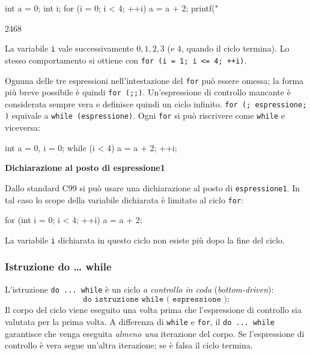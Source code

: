 \documentclass[11pt,a4paper]{article}
\begin{document}
\begin{esempio}
\begin{codice}
int a = 0;
int i;
for (i = 0; i < 4; ++i) {
    a = a + 2;
    printf("%
}
\end{codice}
\begin{risultato}
2468
\end{risultato}
La variabile \lstinline|i| vale successivamente $0, 1, 2, 3$ (e $4$, quando il ciclo termina). Lo stesso comportamento si ottiene con \lstinline|for (i = 1; i <= 4; ++i)|.
\end{esempio}

Ognuna delle tre espressioni nell'intestazione del \lstinline|for| può essere omessa; la forma più breve possibile è quindi \lstinline|for (;;)|. Un'espressione di controllo mancante è considerata sempre vera e definisce quindi un ciclo infinito. \lstinline|for (; espressione; )| equivale a \lstinline|while (espressione)|. Ogni \lstinline|for| si può riscrivere come \lstinline|while| e viceversa:
\begin{codice}
int a = 0, i = 0;
while (i < 4)
{
    a = a + 2;
    ++i;
}
\end{codice}

\medskip\noindent\textbf{Dichiarazione al posto di espressione1}\par\nopagebreak

Dallo standard C99 si può usare una dichiarazione al posto di \texttt{espressione1}. In tal caso lo scope della variabile dichiarata è limitato al ciclo \lstinline|for|:
\begin{codice}
for (int i = 0; i < 4; ++i) {
    a = a + 2;
}
\end{codice}
La variabile \lstinline|i| dichiarata in questo ciclo non esiste più dopo la fine del ciclo.

\subsubsection{Istruzione do \dots{} while}

L'istruzione \lstinline|do ... while| è un ciclo \emph{a controllo in coda} (\emph{bottom-driven}):
\[
\texttt{do istruzione while ( espressione );}
\]
Il corpo del ciclo viene eseguito una volta prima che l'espressione di controllo sia valutata per la prima volta. A differenza di \lstinline|while| e \lstinline|for|, il \lstinline|do ... while| garantisce che venga eseguita \emph{almeno una} iterazione del corpo. Se l'espressione di controllo è vera segue un'altra iterazione; se è falsa il ciclo termina.
\end{document}
